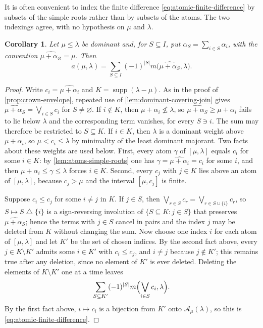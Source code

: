 \documentclass[11pt]{article}
\newtheorem{corollary}[corollary]{Corollary}
\theoremstyle{definition}
\theoremstyle{remark}
\newcommand{\supp}{\operatorname{supp}}
\begin{document}
It is often convenient to index the finite difference
\eqref{eq:atomic-finite-difference} by subsets of the simple roots rather than
by subsets of the atoms.  The two indexings agree, with no hypothesis on
$\mu$ and $\lambda$.

\begin{corollary}
\label{cor:atomic-finite-difference-simple}
Let $\mu\le\lambda$ be dominant and, for $S\subseteq I$, put
$\alpha_S=\sum_{i\in S}\alpha_i$, with the convention
$\widehat{\mu+\alpha_\varnothing}=\mu$.  Then
\begin{equation}\label{eq:atomic-finite-difference-simple}
   a(\mu,\lambda)
      =\sum_{S\subseteq I}(-1)^{|S|}
          m\bigl(\widehat{\mu+\alpha_S},\lambda\bigr).
\end{equation}
\end{corollary}

\begin{proof}
Write $c_i=\widehat{\mu+\alpha_i}$ and $K=\supp(\lambda-\mu)$.  As in the
proof of \cref{prop:crown-envelope}, repeated use of
\cref{lem:dominant-covering-join} gives
$\widehat{\mu+\alpha_S}=\bigvee_{i\in S}c_i$ for $S\ne\varnothing$.  If
$i\notin K$, then $\mu+\alpha_i\nleq\lambda$, so
$\widehat{\mu+\alpha_S}\ge\mu+\alpha_i$ fails to lie below $\lambda$ and the
corresponding term vanishes, for every $S\ni i$.  The sum may therefore be
restricted to $S\subseteq K$.  If $i\in K$, then $\lambda$ is a dominant
weight above $\mu+\alpha_i$, so $\mu<c_i\le\lambda$ by minimality of the least
dominant majorant.  Two facts about these weights are used below.  First,
every atom $\gamma$ of $[\mu,\lambda]$ equals $c_i$ for some $i\in K$: by
\cref{lem:atoms-simple-roots} one has $\gamma=\widehat{\mu+\alpha_i}=c_i$ for
some $i$, and then $\mu+\alpha_i\le\gamma\le\lambda$ forces $i\in K$.  Second,
every $c_j$ with $j\in K$ lies above an atom of $[\mu,\lambda]$, because
$c_j>\mu$ and the interval $[\mu,c_j]$ is finite.

Suppose $c_i\le c_j$ for some $i\ne j$ in $K$.  If $j\in S$, then
$\bigvee_{r\in S}c_r=\bigvee_{r\in S\cup\{i\}}c_r$, so
$S\mapsto S\bigtriangleup\{i\}$ is a sign-reversing involution of
$\{S\subseteq K:j\in S\}$ that preserves $\widehat{\mu+\alpha_S}$; hence the
terms with $j\in S$ cancel in pairs and the index $j$ may be deleted from $K$
without changing the sum.  Now choose one index $i$ for each atom of
$[\mu,\lambda]$ and let $K'$ be the set of chosen indices.  By the second
fact above, every $j\in K\setminus K'$ admits some $i\in K'$ with
$c_i\le c_j$, and $i\ne j$ because $j\notin K'$; this remains true after any
deletion, since no element of $K'$ is ever deleted.
Deleting the elements of $K\setminus K'$ one at a time leaves
\[
   \sum_{S\subseteq K'}(-1)^{|S|}
     m\Bigl(\bigvee_{i\in S}c_i,\lambda\Bigr).
\]
By the first fact above, $i\mapsto c_i$ is a bijection from $K'$ onto
$\mathcal A_\mu(\lambda)$, so this is \eqref{eq:atomic-finite-difference}.
\end{proof}
\end{document}
